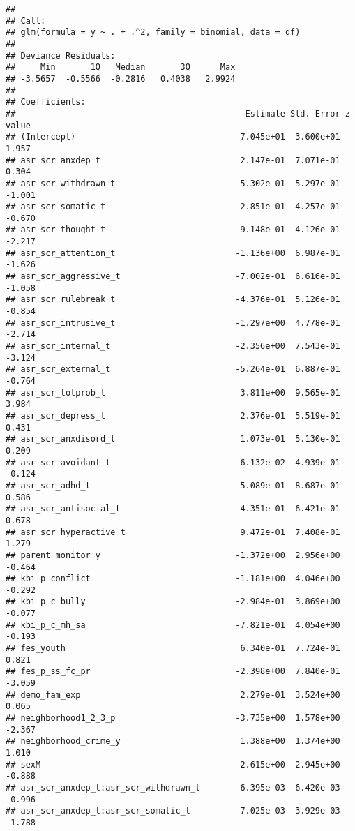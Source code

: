 \documentclass[
]{article}
\begin{document}
\begin{verbatim}
## 
## Call:
## glm(formula = y ~ . + .^2, family = binomial, data = df)
## 
## Deviance Residuals: 
##     Min       1Q   Median       3Q      Max  
## -3.5657  -0.5566  -0.2816   0.4038   2.9924  
## 
## Coefficients:
##                                              Estimate Std. Error z value
## (Intercept)                                 7.045e+01  3.600e+01   1.957
## asr_scr_anxdep_t                            2.147e-01  7.071e-01   0.304
## asr_scr_withdrawn_t                        -5.302e-01  5.297e-01  -1.001
## asr_scr_somatic_t                          -2.851e-01  4.257e-01  -0.670
## asr_scr_thought_t                          -9.148e-01  4.126e-01  -2.217
## asr_scr_attention_t                        -1.136e+00  6.987e-01  -1.626
## asr_scr_aggressive_t                       -7.002e-01  6.616e-01  -1.058
## asr_scr_rulebreak_t                        -4.376e-01  5.126e-01  -0.854
## asr_scr_intrusive_t                        -1.297e+00  4.778e-01  -2.714
## asr_scr_internal_t                         -2.356e+00  7.543e-01  -3.124
## asr_scr_external_t                         -5.264e-01  6.887e-01  -0.764
## asr_scr_totprob_t                           3.811e+00  9.565e-01   3.984
## asr_scr_depress_t                           2.376e-01  5.519e-01   0.431
## asr_scr_anxdisord_t                         1.073e-01  5.130e-01   0.209
## asr_scr_avoidant_t                         -6.132e-02  4.939e-01  -0.124
## asr_scr_adhd_t                              5.089e-01  8.687e-01   0.586
## asr_scr_antisocial_t                        4.351e-01  6.421e-01   0.678
## asr_scr_hyperactive_t                       9.472e-01  7.408e-01   1.279
## parent_monitor_y                           -1.372e+00  2.956e+00  -0.464
## kbi_p_conflict                             -1.181e+00  4.046e+00  -0.292
## kbi_p_c_bully                              -2.984e-01  3.869e+00  -0.077
## kbi_p_c_mh_sa                              -7.821e-01  4.054e+00  -0.193
## fes_youth                                   6.340e-01  7.724e-01   0.821
## fes_p_ss_fc_pr                             -2.398e+00  7.840e-01  -3.059
## demo_fam_exp                                2.279e-01  3.524e+00   0.065
## neighborhood1_2_3_p                        -3.735e+00  1.578e+00  -2.367
## neighborhood_crime_y                        1.388e+00  1.374e+00   1.010
## sexM                                       -2.615e+00  2.945e+00  -0.888
## asr_scr_anxdep_t:asr_scr_withdrawn_t       -6.395e-03  6.420e-03  -0.996
## asr_scr_anxdep_t:asr_scr_somatic_t         -7.025e-03  3.929e-03  -1.788

\end{verbatim}
\end{document}
